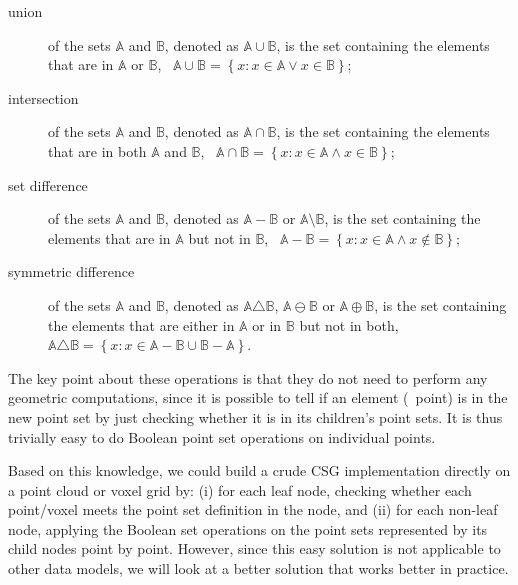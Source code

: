 \begin{description}
\item[union] of the sets \(\mathbb{A}\) and \(\mathbb{B}\), denoted as \(\mathbb{A} \cup \mathbb{B}\), is the set containing the elements that are in \(\mathbb{A}\) or \(\mathbb{B}\), \ie\ \( \mathbb{A} \cup \mathbb{B} = \left\{ x : x \in \mathbb{A} \vee x \in \mathbb{B} \right\} \);
\item[intersection] of the sets \(\mathbb{A}\) and \(\mathbb{B}\), denoted as \(\mathbb{A} \cap \mathbb{B}\), is the set containing the elements that are in both \(\mathbb{A}\) and \(\mathbb{B}\), \ie\ \( \mathbb{A} \cap \mathbb{B} = \left\{ x : x \in \mathbb{A} \wedge x \in \mathbb{B} \right\} \);
\item[set difference] of the sets \(\mathbb{A}\) and \(\mathbb{B}\), denoted as \(\mathbb{A} - \mathbb{B}\) or \(\mathbb{A} \setminus \mathbb{B}\), is the set containing the elements that are in \(\mathbb{A}\) but not in \(\mathbb{B}\), \ie\ \( \mathbb{A} - \mathbb{B} = \left\{ x : x \in \mathbb{A} \wedge x \notin \mathbb{B} \right\} \);
\item[symmetric difference] of the sets \(\mathbb{A}\) and \(\mathbb{B}\), denoted as \(\mathbb{A} \triangle \mathbb{B}\), \(\mathbb{A} \ominus \mathbb{B}\) or \(\mathbb{A} \oplus \mathbb{B}\), is the set containing the elements that are either in \(\mathbb{A}\) or in \(\mathbb{B}\) but not in both, \ie\ \( \mathbb{A} \triangle \mathbb{B} = \left\{ x : x \in \mathbb{A} - \mathbb{B} \cup \mathbb{B} - \mathbb{A} \right\} \).
\end{description}

The key point about these operations is that they do not need to perform any geometric computations, since it is possible to tell if an element (\ie\ point) is in the new point set by just checking whether it is in its children's point sets.
It is thus trivially easy to do Boolean point set operations on individual points.

Based on this knowledge, we could build a crude CSG implementation directly on a point cloud or voxel grid by: (i) for each leaf node, checking whether each point/voxel meets the point set definition in the node, and (ii) for each non-leaf node, applying the Boolean set operations on the point sets represented by its child nodes point by point.
However, since this easy solution is not applicable to other data models, we will look at a better solution that works better in practice.

